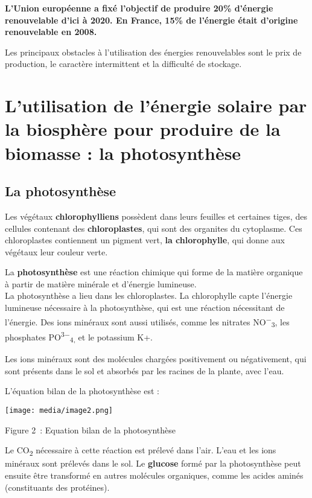 \begin{itemize}
\textbf{L'Union européenne a fixé l'objectif de produire 20\% d'énergie
renouvelable d'ici à 2020. En France, 15\% de l'énergie était d'origine
renouvelable en 2008.}

Les principaux obstacles à l'utilisation des énergies renouvelables sont
le prix de production, le caractère intermittent et la difficulté de
stockage.


  \section{L'utilisation de l'énergie solaire par la biosphère pour
  produire de la biomasse : la
  photosynthèse}\label{lutilisation-de-luxe9nergie-solaire-par-la-biosphuxe8re-pour-produire-de-la-biomasse-la-photosynthuxe8se}

  
    \subsection{La photosynthèse}\label{la-photosynthuxe8se}


Les végétaux \textbf{chlorophylliens} possèdent dans leurs feuilles et
certaines tiges, des cellules contenant des \textbf{chloroplastes}, qui
sont des organites du cytoplasme. Ces chloroplastes contiennent un
pigment vert, \textbf{la chlorophylle}, qui donne aux végétaux leur
couleur verte.

La \textbf{photosynthèse} est une réaction chimique qui forme de la
matière organique à partir de matière minérale et d'énergie lumineuse.\\
La photosynthèse a lieu dans les chloroplastes. La chlorophylle capte
l'énergie lumineuse nécessaire à la photosynthèse, qui est une réaction
nécessitant de l'énergie. Des ions minéraux sont aussi utilisés, comme
les nitrates NO\textsuperscript{−}\textsubscript{3}, les phosphates
PO\textsuperscript{3−}\textsubscript{4,} et le potassium K+.

Les ions minéraux sont des molécules chargées positivement ou
négativement, qui sont présents dans le sol et absorbés par les racines
de la plante, avec l'eau.

L'équation bilan de la photosynthèse est :

\texttt{[image: media/image2.png]}

\protect\hypertarget{equation-bilan-de-la-photosynthuxe8se}{}{}Figure
2~: Equation bilan de la photosynthèse

Le CO\textsubscript{2} nécessaire à cette réaction est prélevé dans
l'air. L'eau et les ions minéraux sont prélevés dans le sol. Le
\textbf{glucose} formé par la photosynthèse peut ensuite être transformé
en autres molécules organiques, comme les acides aminés (constituants
des protéines).


\end{itemize}
